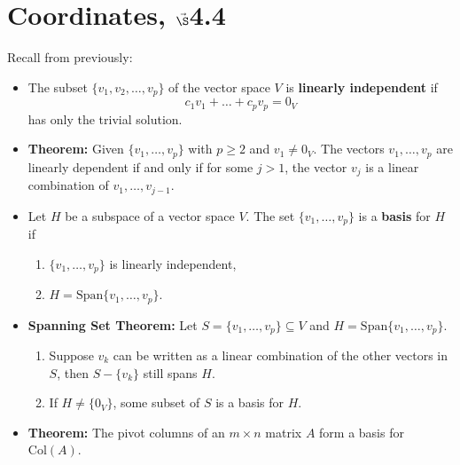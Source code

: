 


%
%
%

\section{{Coordinates, $\vec\S$4.4}}%
% 

%
\thispagestyle{fancy}

Recall from previously:

\begin{itemize}
\item 	The subset $\{ v_1, v_2, \dots, v_p\}$ of the vector space $V$ is {\bf linearly independent} if $$c_1 v_1+\dots+ c_p v_p =0_V$$ has only the trivial solution.
\item {\bf Theorem:} Given $\{ v_1, \dots, v_p\}$ with $p\geq 2$ and $v_1\neq 0_V$. The vectors $v_1, \dots, v_p$ are linearly dependent if and only if for some $j>1$, the vector $v_j$ is a linear combination of $v_1, \dots, v_{j-1}$.
\item Let $H$ be a subspace of a vector space $V$. The set $\{v_1, \dots, v_p\}$ is a {\bf basis} for $H$ if
	\begin{enumerate}
		\item  $\{v_1, \dots, v_p\}$ is linearly independent,
		\item $H=\text{Span}\{v_1, \dots, v_p \}$.
	\end{enumerate}
\item {\bf Spanning Set Theorem:} Let $S=\{ v_1,\dots,v_p\} \subseteq V$ and $H=\text{Span}\{v_1,\dots, v_p \}$.
\begin{enumerate}
	\item Suppose $v_k$ can be written as a linear combination of the other vectors in $S$, then $S-\{v_k\}$ still spans $H$.
	\item If $H\neq \{ 0_V\}$, some subset of $S$ is a basis for $H$.
\end{enumerate} 
\item {\bf Theorem:} The pivot columns of an $m \times n$ matrix $A$ form a basis for $\text{Col}(A)$.
\end{itemize}

